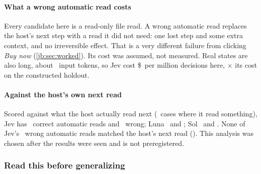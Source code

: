 \paragraph{What a wrong automatic read costs} Every candidate here is a read-only file read. A wrong
automatic read replaces the host's next step with a read it did not need: one lost step and some extra
context, and no irreversible effect. That is a very different failure from clicking \emph{Buy now}
(\cref{jb:sec:worked}). Its cost was assumed, not measured. Real states are also long, about
\TrJevInputTokens\ input tokens, so Jev cost \$\TrJevCost\ per million decisions here, \TrJevCostXFirst$\times$
its cost on the constructed holdout.

\paragraph{Against the host's own next read} Scored against what the host actually read next (\TrHostReadCases\
cases where it read something), Jev has \TrJevHostReads\ correct automatic reads and \TrJevHostWa\ wrong;
Luna \TrLunaHostReads\ and \TrLunaHostWa; Sol \TrSolHostReads\ and \TrSolHostWa. None of Jev's \TrJevWaK\
wrong automatic reads matched the host's next read (\TrJevWaMatchHost). This analysis was chosen after the
results were seen and is not preregistered.

\subsubsection{Read this before generalizing}\label{jb:sec:caveats}

